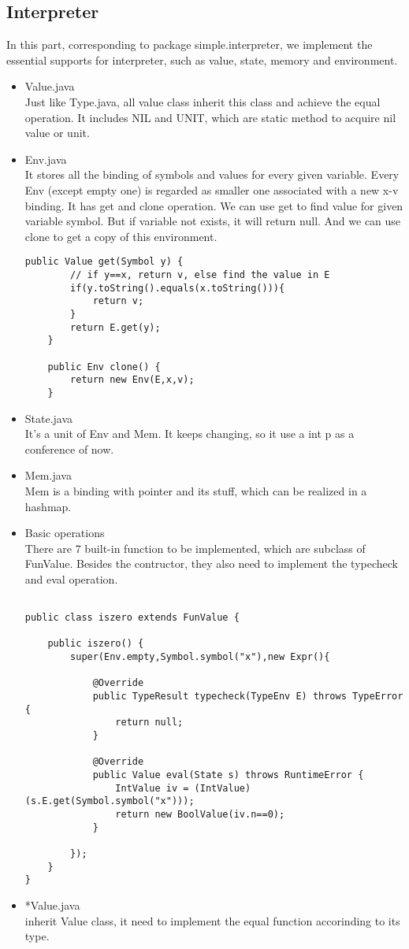 \documentclass[paper=a4, fontsize=11pt]{scrartcl}
\begin{document}
\subsection{Interpreter}
In this part, corresponding to package simple.interpreter, we implement the essential supports for interpreter, such as value, state, memory and environment. 
\begin{itemize}
\item Value.java \\
Just like Type.java, all value class inherit this class and achieve the equal operation. It includes NIL and UNIT, which are static method to acquire nil value or unit.
\item Env.java \\
It stores all the binding of symbols and values for every given variable. Every Env (except empty one) is regarded as smaller one associated with a new x-v binding. It has get and clone operation. We can use get to find value for given variable symbol. But if variable not exists, it will return null. And we can use clone to get a copy of this environment.
\begin{lstlisting}[title=Env, frame=shadowbox]
    public Value get(Symbol y) {
        // if y==x, return v, else find the value in E
        if(y.toString().equals(x.toString())){
            return v;
        }
        return E.get(y);
    }

    public Env clone() {
        return new Env(E,x,v);
    }
\end{lstlisting}
\item State.java \\
It's a unit of Env and Mem. It keeps changing, so it use a int p as a conference of now.
\item Mem.java \\
Mem is a binding with pointer and its stuff, which can be realized in a hashmap.
\item Basic operations \\
There are 7 built-in function to be implemented, which are subclass of FunValue. Besides the contructor, they also need to implement the typecheck and eval operation.
\begin{lstlisting}[title=iszero, frame=shadowbox]

public class iszero extends FunValue {

    public iszero() {
        super(Env.empty,Symbol.symbol("x"),new Expr(){

            @Override
            public TypeResult typecheck(TypeEnv E) throws TypeError {
                return null;
            }

            @Override
            public Value eval(State s) throws RuntimeError {
                IntValue iv = (IntValue)(s.E.get(Symbol.symbol("x")));
                return new BoolValue(iv.n==0);
            }
            
        });
    }
}

\end{lstlisting}
\item *Value.java \\
inherit Value class, it need to implement the equal function accorinding to its type.
\end{itemize}
\end{document}
